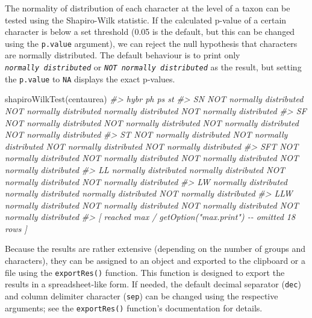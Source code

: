 \documentclass[
  11pt,
  a4paper]{article}
\newenvironment{Shaded}{\begin{snugshade}}{\end{snugshade}}
\newcommand{\CommentTok}[1]{\textcolor[rgb]{0.56,0.35,0.01}{\textit{#1}}}
\newcommand{\FunctionTok}[1]{\textcolor[rgb]{0.00,0.00,0.00}{#1}}
\newcommand{\NormalTok}[1]{#1}
\begin{document}
The normality of distribution of each character at the level of a taxon
can be tested using the Shapiro-Wilk statistic. If the calculated
p-value of a certain character is below a set threshold (0.05 is the
default, but this can be changed using the \texttt{p.value} argument),
we can reject the null hypothesis that characters are normally
distributed. The default behaviour is to print only
\emph{\texttt{normally\ distributed}} or
\emph{\texttt{NOT\ normally\ distributed}} as the result, but setting
the \texttt{p.value} to \texttt{NA} displays the exact p-values.

\begin{Shaded}
\begin{Highlighting}[]
\FunctionTok{shapiroWilkTest}\NormalTok{(centaurea)}
\CommentTok{\#\textgreater{}                         hybr                       ph                       ps                       st}
\CommentTok{\#\textgreater{} SN  NOT normally distributed NOT normally distributed     normally distributed NOT normally distributed}
\CommentTok{\#\textgreater{} SF  NOT normally distributed NOT normally distributed NOT normally distributed NOT normally distributed}
\CommentTok{\#\textgreater{} ST  NOT normally distributed NOT normally distributed NOT normally distributed NOT normally distributed}
\CommentTok{\#\textgreater{} SFT NOT normally distributed NOT normally distributed NOT normally distributed NOT normally distributed}
\CommentTok{\#\textgreater{} LL      normally distributed     normally distributed NOT normally distributed NOT normally distributed}
\CommentTok{\#\textgreater{} LW      normally distributed     normally distributed     normally distributed NOT normally distributed}
\CommentTok{\#\textgreater{} LLW     normally distributed NOT normally distributed NOT normally distributed NOT normally distributed}
\CommentTok{\#\textgreater{}  [ reached \textquotesingle{}max\textquotesingle{} / getOption("max.print") {-}{-} omitted 18 rows ]}
\end{Highlighting}
\end{Shaded}

Because the results are rather extensive (depending on the number of
groups and characters), they can be assigned to an object and exported
to the clipboard or a file using the \texttt{exportRes()} function. This
function is designed to export the results in a spreadsheet-like form.
If needed, the default decimal separator (\texttt{dec}) and column
delimiter character (\texttt{sep}) can be changed using the respective
arguments; see the \texttt{exportRes()} function's documentation for
details.
\end{document}

